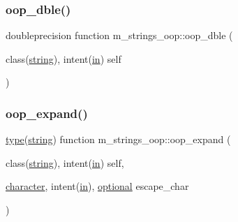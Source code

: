 \subsubsection{\texorpdfstring{oop\+\_\+dble()}{oop\_dble()}}
{\footnotesize\ttfamily doubleprecision function m\+\_\+strings\+\_\+oop\+::oop\+\_\+dble (\begin{DoxyParamCaption}\item[{class(\hyperlink{structm__strings__oop_1_1string}{string}), intent(\hyperlink{M__journal_83_8txt_afce72651d1eed785a2132bee863b2f38}{in})}]{self }\end{DoxyParamCaption})\hspace{0.3cm}{\ttfamily [private]}}

\mbox{\label{namespacem__strings__oop_a5b96d2a6f242a096cd5788cf0802e825}} 
\subsubsection{\texorpdfstring{oop\+\_\+expand()}{oop\_expand()}}
{\footnotesize\ttfamily \hyperlink{stop__watch_83_8txt_a70f0ead91c32e25323c03265aa302c1c}{type}(\hyperlink{structm__strings__oop_1_1string}{string}) function m\+\_\+strings\+\_\+oop\+::oop\+\_\+expand (\begin{DoxyParamCaption}\item[{class(\hyperlink{structm__strings__oop_1_1string}{string}), intent(\hyperlink{M__journal_83_8txt_afce72651d1eed785a2132bee863b2f38}{in})}]{self,  }\item[{\hyperlink{option__stopwatch_83_8txt_abd4b21fbbd175834027b5224bfe97e66}{character}, intent(\hyperlink{M__journal_83_8txt_afce72651d1eed785a2132bee863b2f38}{in}), \hyperlink{option__stopwatch_83_8txt_aa4ece75e7acf58a4843f70fe18c3ade5}{optional}}]{escape\+\_\+char }\end{DoxyParamCaption})\hspace{0.3cm}{\ttfamily [private]}}

\mbox{\label{namespacem__strings__oop_aafe02b26ccba21eb8a35e9fa99d6c790}} 
